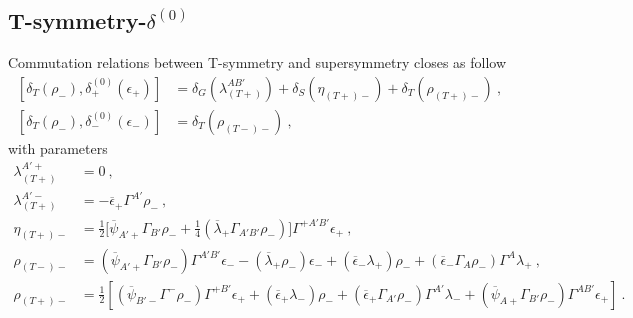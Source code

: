 \documentclass[a4paper,10pt,openany]{article}
\begin{document}
	\subsection[T-symmetry-$\delta^{(0)}$]{T-symmetry-\boldmath$\delta^{(0)}$}
	Commutation relations between T-symmetry and supersymmetry closes as follow
	\begin{subequations}
		\begin{align}
			[\delta_{T}(\rho_{-}),\delta^{(0)}_{+}(\epsilon_{+})]&=\delta_{G}(\lambda_{(T+)}^{AB'})+\delta_{S}(\eta_{(T+)-})+\delta_{T}(\rho_{(T+)-})\ , \\
			[\delta_{T}(\rho_{-}),\delta^{(0)}_{-}(\epsilon_{-})]&=\delta_{T}(\rho_{(T-)-})\ ,
		\end{align}
	\end{subequations}
	with parameters
	\begin{subequations}
		\begin{align}
			\lambda_{(T+)}^{A'+}&=0\ , \\
			\lambda_{(T+)}^{A'-}&=-\overline{\epsilon}_{+}\Gamma^{A'}\rho_{-}\ , \\
			\eta_{(T+)-}&=\frac{1}{2}\bigg[\overline{\psi}_{A'+}\Gamma_{B'}\rho_{-}+\frac{1}{4}(\overline{\lambda}_{+}\Gamma_{A'B'}\rho_{-})\bigg]\Gamma^{+A'B'}\epsilon_{+}\ , \\
			\rho_{(T-)-}&=(\overline{\psi}_{A'+}\Gamma_{B'}\rho_{-})\Gamma^{A'B'}\epsilon_{-}-(\overline{\lambda}_{+}\rho_{-})\epsilon_{-}+(\overline{\epsilon}_{-}\lambda_{+})\rho_{-}+(\overline{\epsilon}_{-}\Gamma_{A}\rho_{-})\Gamma^{A}\lambda_{+}\ , \\
			\rho_{(T+)-}&=\frac{1}{2}[(\overline{\psi}_{B'-}\Gamma^{-}\rho_{-})\Gamma^{+B'}\epsilon_{+}+(\overline{\epsilon}_{+}\lambda_{-})\rho_{-}+(\overline{\epsilon}_{+}\Gamma_{A'}\rho_{-})\Gamma^{A'}\lambda_{-}+(\overline{\psi}_{A+}\Gamma_{B'}\rho_{-})\Gamma^{AB'}\epsilon_{+}]\ .
		\end{align}
	\end{subequations}
	
	
\end{document}

